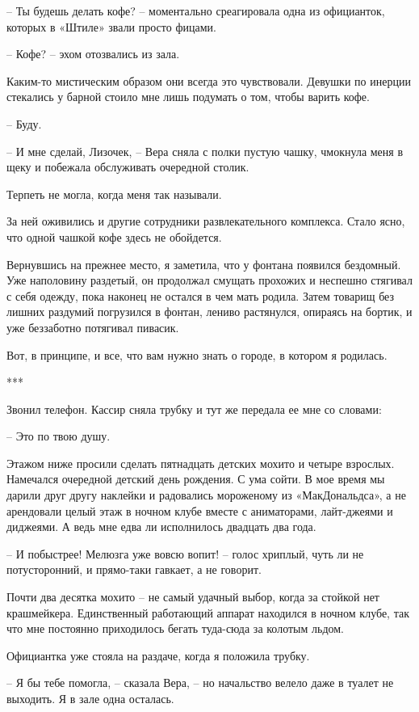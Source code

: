 \documentclass[
]{book}
\begin{document}
-- Ты будешь делать кофе? -- моментально среагировала одна из официанток, которых в «Штиле» звали просто фицами.

-- Кофе? -- эхом отозвались из зала.

Каким-то мистическим образом они всегда это чувствовали. Девушки по инерции стекались у барной стоило мне лишь подумать о том, чтобы варить кофе.

-- Буду.

-- И мне сделай, Лизочек, -- Вера сняла с полки пустую чашку, чмокнула меня в щеку и побежала обслуживать очередной столик.

Терпеть не могла, когда меня так называли.

За ней оживились и другие сотрудники развлекательного комплекса. Стало ясно, что одной чашкой кофе здесь не обойдется.

Вернувшись на прежнее место, я заметила, что у фонтана появился бездомный. Уже наполовину раздетый, он продолжал смущать прохожих и неспешно стягивал с себя одежду, пока наконец не остался в чем мать родила. Затем товарищ без лишних раздумий погрузился в фонтан, лениво растянулся, опираясь на бортик, и уже беззаботно потягивал пивасик.

Вот, в принципе, и все, что вам нужно знать о городе, в котором я родилась.

***

Звонил телефон. Кассир сняла трубку и тут же передала ее мне со словами:

-- Это по твою душу.

Этажом ниже просили сделать пятнадцать детских мохито и четыре взрослых. Намечался очередной детский день рождения. С ума сойти. В мое время мы дарили друг другу наклейки и радовались мороженому из «МакДональдса», а не арендовали целый этаж в ночном клубе вместе с аниматорами, лайт-джеями и диджеями. А ведь мне едва ли исполнилось двадцать два года.

-- И побыстрее! Мелюзга уже вовсю вопит! -- голос хриплый, чуть ли не потусторонний, и прямо-таки гавкает, а не говорит.

Почти два десятка мохито -- не самый удачный выбор, когда за стойкой нет крашмейкера. Единственный работающий аппарат находился в ночном клубе, так что мне постоянно приходилось бегать туда-сюда за колотым льдом.

Официантка уже стояла на раздаче, когда я положила трубку.

-- Я бы тебе помогла, -- сказала Вера, -- но начальство велело даже в туалет не выходить. Я в зале одна осталась.
\end{document}
